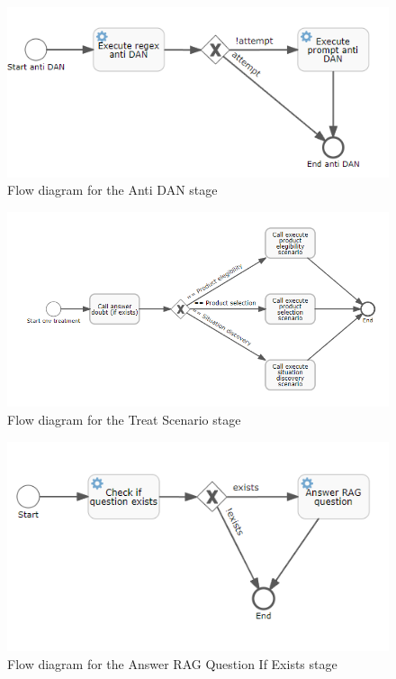 \documentclass[a4paper,12pt,twoside]{ThesisStyle}
\begin{document}
\begin{figure}[htb]
  \centering
  \includegraphics[width=1\textwidth]{imatges/1_DsoExecuteAntiDAN.png}
  \caption{Flow diagram for the Anti DAN stage}
  \label{fig:antidan}
\end{figure}

\begin{figure}[htb]
  \centering
  \includegraphics[width=1\textwidth]{imatges/2_DsoTreatScenario.png}
  \caption{Flow diagram for the Treat Scenario stage}
\end{figure}

\begin{figure}[htb]
  \centering
  \includegraphics[width=1\textwidth]{imatges/3_AnswerRagQuestionIfExists.png}
  \caption{Flow diagram for the Answer RAG Question If Exists stage}
\end{figure}
\end{document}
